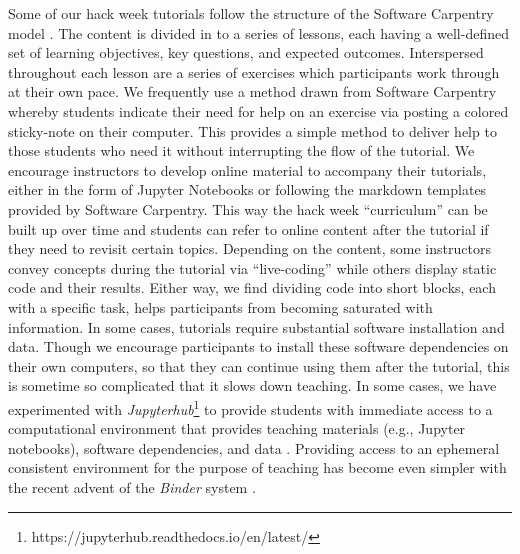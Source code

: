 \documentclass{aastex62}
\begin{document}
Some of our hack week tutorials follow the structure of the Software Carpentry model \citep{b:wilson-swc-lessons-2016}. The content is divided in to a series of lessons, each having a well-defined set of learning objectives, key questions, and expected outcomes. Interspersed throughout each lesson are a series of exercises which participants work through at their own pace. We frequently use a method drawn from Software Carpentry whereby students indicate their need for help on an exercise via posting a colored sticky-note on their computer. This provides a simple method to deliver help to those students who need it without interrupting the flow of the tutorial. We encourage instructors to develop online material to accompany their tutorials, either in the form of Jupyter Notebooks \citep{kluyver2016jupyter} or following the markdown templates provided by Software Carpentry. This way the hack week ``curriculum'' can be built up over time and students can refer to online content after the tutorial if they need to revisit certain topics. Depending on the content, some instructors convey concepts during the tutorial via ``live-coding'' while others display static code and their results. Either way, we find dividing code into short blocks, each with a specific task, helps participants from becoming saturated with information.
In some cases, tutorials require substantial software installation and data. Though we encourage participants to install these software dependencies on their own computers, so that they can continue using them after the tutorial, this is sometime so complicated that it slows down teaching. In some cases, we have experimented with \emph{Jupyterhub}\footnote{https://jupyterhub.readthedocs.io/en/latest/} to provide students with immediate access to a computational environment that provides teaching materials (e.g., Jupyter notebooks), software dependencies, and data \citep{holdgraf2017portable}. Providing access to an ephemeral consistent environment for the purpose of teaching has become even simpler with the recent advent of the \emph{Binder} system \citep{Holdgraf2017-pd, Titus_Brown_undated-pc}.
\end{document}
